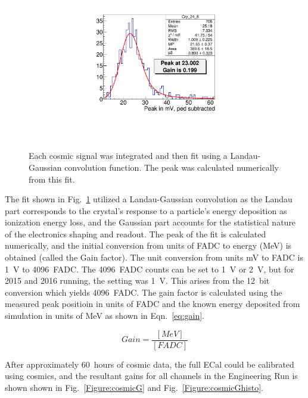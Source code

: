 \begin{figure}[H]
  \centering
      \includegraphics[width=0.8\textwidth]{pics/performance/cosmicFitExample2015.pdf}
  \caption[Integrated cosmic signal in ECal fitted for calibration]{Each cosmic signal was integrated and then fit using a Landau-Gaussian convolution function. The peak was calculated numerically from this fit.}
  \label{Figure:cosmicFit}
\end{figure}

The fit shown in Fig.~\ref{Figure:cosmicFit} utilized a Landau-Gaussian convolution as the Landau part corresponds to the crystal's response to a particle's energy deposition as ionization energy loss, and the Gaussian part accounts for the statistical nature of the electronics shaping and readout. The peak of the fit is calculated numerically, and the initial conversion from units of FADC to energy (MeV) is obtained (called the Gain factor). The unit conversion from units mV to FADC is 1~V to 4096~FADC. The 4096~FADC counts can be set to 1~V or 2~V, but for 2015 and 2016 running, the setting was 1~V. This arises from the 12~bit conversion which yields 4096~FADC. The gain factor is calculated using the measured peak positioin in units of FADC and the known energy deposited from simulation in units of MeV as shown in Eqn.~\eqref{eq:gain}.

\begin{equation}
	\label{eq:gain}
	Gain = \dfrac{[MeV]}{[FADC]} 
\end{equation}

After approximately 60~hours of cosmic data, the full ECal could be calibrated using cosmics, and the resultant gains for all channels in the Engineering Run is shown shown in Fig.~\ref{Figure:cosmicG} and Fig.~\ref{Figure:cosmicGhisto}.


